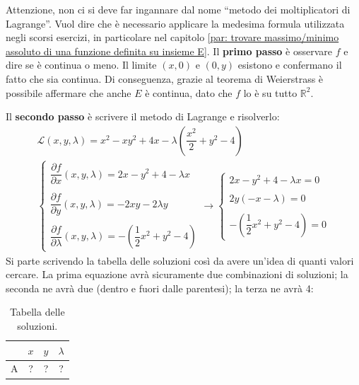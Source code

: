 \documentclass[a4paper]{article}
\newcommand{\dquotes}[1]{``#1''}
\begin{document}
	\noindent
	Attenzione, non ci si deve far ingannare dal nome \dquotes{metodo dei moltiplicatori di Lagrange}. Vuol dire che è necessario applicare la medesima formula utilizzata negli scorsi esercizi, in particolare nel capitolo \ref{par: trovare massimo/minimo assoluto di una funzione definita su insieme E}. Il \textbf{primo passo} è osservare $f$ e dire se è continua o meno. Il limite $\left(x,0\right)$ e $\left(0,y\right)$ esistono e confermano il fatto che sia continua. Di conseguenza, grazie al teorema di Weierstrass è possibile affermare che anche $E$ è continua, dato che $f$ lo è su tutto $\mathbb{R}^{2}$.\newline

	\noindent
	Il \textbf{secondo passo} è scrivere il metodo di Lagrange e risolverlo:
	\begin{gather*}
		\mathcal{L}\left(x,y,\lambda\right) = x^{2}-xy^{2}+4x - \lambda\left(\dfrac{x^{2}}{2} + y^{2} - 4\right) \\
		\begin{cases}
			\dfrac{\partial f}{\partial x}\left(x,y,\lambda\right) = 2x - y^{2} + 4 - \lambda x \\
			\\
			\dfrac{\partial f}{\partial y}\left(x,y,\lambda\right) = -2xy -2\lambda y \\
			\\
			\dfrac{\partial f}{\partial \lambda}\left(x,y,\lambda\right) = - \left(\dfrac{1}{2} x^{2} + y^{2} - 4\right)
		\end{cases}
		\longrightarrow
		\begin{cases}
			2x - y^{2} + 4 - \lambda x = 0 \\
			\\
			2y\left(- x - \lambda\right) = 0 \\
			\\
			- \left(\dfrac{1}{2} x^{2} + y^{2} - 4\right) = 0
		\end{cases}
	\end{gather*}
	Si parte scrivendo la tabella delle soluzioni così da avere un'idea di quanti valori cercare. La prima equazione avrà sicuramente due combinazioni di soluzioni; la seconda ne avrà due (dentro e fuori dalle parentesi); la terza ne avrà 4:
	\begin{table}[!htp]
		\centering
		\begin{tabular}{@{} l | c | c | c @{}}
			\toprule
			& $x$ & $y$ & $\lambda$ \\
			\midrule
			A & ? & ? & ? \\
			\bottomrule
		\end{tabular}
		\caption*{Tabella delle soluzioni.}
	\end{table}\newpage
\end{document}
